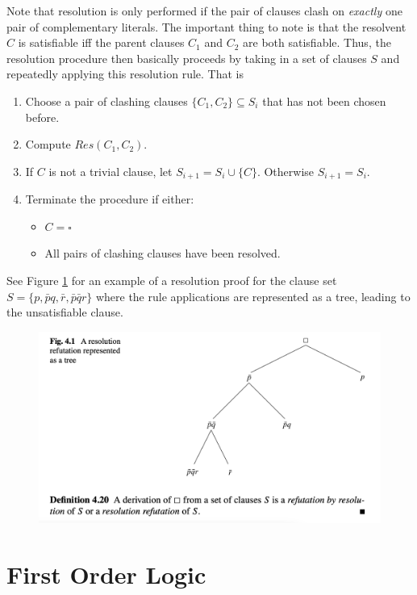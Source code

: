 \documentclass[10pt]{article}
\begin{document}
Note that resolution is only performed if the pair of clauses clash on \textit{exactly} one pair of complementary literals. The important thing to note is that the resolvent $C$ is satisfiable iff the parent clauses $C_1$ and $C_2$ are both satisfiable. Thus, the resolution procedure then basically proceeds by taking in a set of clauses $S$ and repeatedly applying this resolution rule. That is
\begin{enumerate}
    \item Choose a pair of clashing clauses $\{C_1,C_2\} \subseteq S_i$ that has not been chosen before.
    \item Compute $Res(C_1,C_2)$.
    \item If $C$ is not a trivial clause, let $S_{i+1}=S_i \cup \{C\}$. Otherwise $S_{i+1}=S_i$.
    \item Terminate the procedure if either:
    \begin{itemize}
        \item $C=\square$
        \item All pairs of clashing clauses have been resolved.
    \end{itemize}
\end{enumerate}
See Figure \ref{fig:resolution-refutation-tree} for an example of a resolution proof for the clause set $S=\{p,\bar{p}q, \bar{r}, \bar{p} \bar{q}r\}$ where the rule applications are represented as a tree, leading to the unsatisfiable clause.
\begin{figure}
    \centering
    \includegraphics[scale=0.25]{figures/refutation-example.png}
    \label{fig:resolution-refutation-tree}
\end{figure}

\section{First Order Logic}
\end{document}
